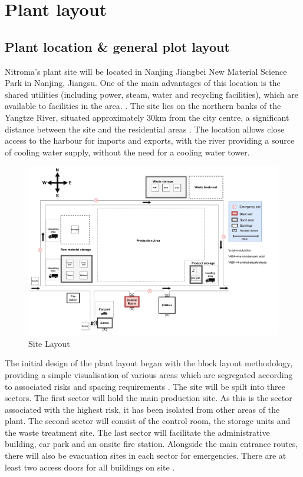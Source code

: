 \section{Plant layout}

\subsection{Plant location \& general plot layout}

Nitroma’s plant site will be located in Nanjing Jiangbei New Material Science Park in Nanjing, Jiangsu. One of the main advantages of this location is the shared utilities (including power, steam, water and recycling facilities), which are available to facilities in the area. \cite{independent_commodity_intelligence_services_china_2007}. The site lies on the northern banks of the Yangtze River, situated approximately 30km from the city centre, a significant distance between the site and the residential areas \cite{zeng_divergent_2011}. The location allows close access to the harbour for imports and exports, with the river providing a source of cooling water supply, without the need for a cooling water tower.

\begin{figure}
\centering
\includegraphics[width=\linewidth]{chapters/5-safety-layout-environment/figures/Plant layout 3.pdf}
\caption{Site Layout}
\label{fig:site}
\end{figure}

The initial design of the plant layout began with the block layout methodology, providing a simple visualisation of various areas which are segregated according to associated risks and spacing requirements \cite{center_for_chemical_process_safety_site_2010}. The site will be spilt into three sectors. The first sector will hold the main production site. As this is the sector associated with the highest risk, it has been isolated from other areas of the plant. The second sector will consist of the control room, the storage units and the waste treatment site. The last sector will facilitate the administrative building, car park and an onsite fire station. Alongside the main entrance routes, there will also be evacuation sites in each sector for emergencies. There are at least two access doors for all buildings on site \cite{aiche_dows_1994}. 

